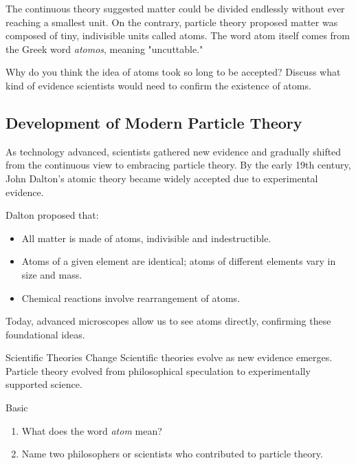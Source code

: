The continuous theory suggested matter could be divided endlessly without ever reaching a smallest unit. On the contrary, particle theory proposed matter was composed of tiny, indivisible units called atoms. The word atom itself comes from the Greek word \textit{atomos}, meaning "uncuttable."


\begin{stopandthink}
Why do you think the idea of atoms took so long to be accepted? Discuss what kind of evidence scientists would need to confirm the existence of atoms.
\end{stopandthink}

\subsection{Development of Modern Particle Theory}

As technology advanced, scientists gathered new evidence and gradually shifted from the continuous view to embracing particle theory. By the early 19th century, John Dalton's atomic theory became widely accepted due to experimental evidence.


Dalton proposed that:
\begin{itemize}
    \item All matter is made of atoms, indivisible and indestructible.
    \item Atoms of a given element are identical; atoms of different elements vary in size and mass.
    \item Chemical reactions involve rearrangement of atoms.
\end{itemize}

Today, advanced microscopes allow us to see atoms directly, confirming these foundational ideas.

\begin{keyconcept}{Scientific Theories Change}
Scientific theories evolve as new evidence emerges. Particle theory evolved from philosophical speculation to experimentally supported science.
\end{keyconcept}

\begin{tieredquestions}{Basic}
\begin{enumerate}
    \item What does the word \textit{atom} mean?
    \item Name two philosophers or scientists who contributed to particle theory.
\end{enumerate}
\end{tieredquestions}

